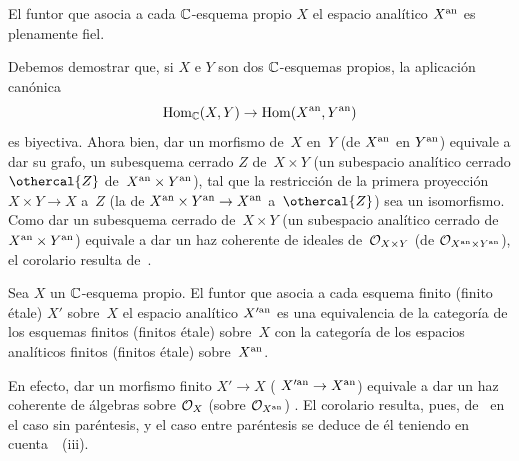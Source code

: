\begin{corollaire}
\label{XII.4.5}
El funtor que asocia a cada $\CC$-esquema propio $X$ el espacio analítico
$X^\an$ es plenamente fiel.
\end{corollaire}

Debemos demostrar que, si $X$ e $Y$ son dos $\CC$-esquemas propios, la
aplicación canónica
$$
\Hom_{\CC}(X,Y)\to\Hom(X^{\an},Y^{\an})
$$
es biyectiva. Ahora bien, dar un morfismo de~$X$ en~$Y$ (\resp de
$X^\an$ en $Y^\an$) equivale a dar su grafo, \ie un subesquema cerrado
$Z$ de~$X\times Y$ (\resp un subespacio analítico cerrado $\othercal{Z}$
de~$X^\an\times Y^\an$), tal que la restricción de la primera proyección
$X\times Y\to X$ a~$Z$ (\resp la de
$X^\an\times Y^\an\to X^\an$ a~$\othercal{Z}$) sea
un isomorfismo. Como dar un subesquema cerrado de~$X\times Y$ (\resp un
subespacio analítico cerrado de~$X^\an\times Y^\an$) equivale a dar un haz
coherente de ideales de~$\cal{O}_{X\times Y}$ (\resp de
$\cal{O}_{X^\an\times Y^\an}$), el corolario resulta de~.

\begin{corollaire}
\label{XII.4.6}
Sea $X$ un $\CC$-esquema propio. El funtor que asocia a cada esquema
finito (\resp finito étale) $X'$ sobre~$X$ el espacio analítico $X'^\an$
es una equivalencia de la categoría de los esquemas finitos (\resp finitos
étale) sobre~$X$ con la categoría de los espacios analíticos finitos
(\resp finitos étale) sobre~$X^\an$.
\end{corollaire}

En efecto, dar un morfismo finito $X'\to X$ (\resp
$X'^\an\to X^\an$) equivale a dar un haz coherente de álgebras sobre
$\cal{O}_X$ (\resp sobre $\cal{O}_{X^\an}$)
\cite[~\S 5~th]{XII.4}. El corolario resulta, pues,
de~ en el caso sin paréntesis, y el caso entre paréntesis se
deduce de él teniendo en cuenta~~(iii).
